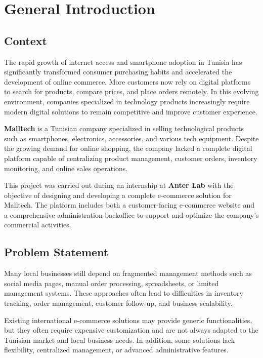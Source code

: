 
\chapter*{General Introduction}

\section*{Context}

The rapid growth of internet access and smartphone adoption in Tunisia has significantly transformed consumer purchasing habits and accelerated the development of online commerce. More customers now rely on digital platforms to search for products, compare prices, and place orders remotely. In this evolving environment, companies specialized in technology products increasingly require modern digital solutions to remain competitive and improve customer experience.

\textbf{Malltech} is a Tunisian company specialized in selling technological products such as smartphones, electronics, accessories, and various tech equipment. Despite the growing demand for online shopping, the company lacked a complete digital platform capable of centralizing product management, customer orders, inventory monitoring, and online sales operations.

This project was carried out during an internship at \textbf{Anter Lab} with the objective of designing and developing a complete e-commerce solution for Malltech. The platform includes both a customer-facing e-commerce website and a comprehensive administration backoffice to support and optimize the company’s commercial activities.

\section*{Problem Statement}

Many local businesses still depend on fragmented management methods such as social media pages, manual order processing, spreadsheets, or limited management systems. These approaches often lead to difficulties in inventory tracking, order management, customer follow-up, and business scalability.

Existing international e-commerce solutions may provide generic functionalities, but they often require expensive customization and are not always adapted to the Tunisian market and local business needs. In addition, some solutions lack flexibility, centralized management, or advanced administrative features.

